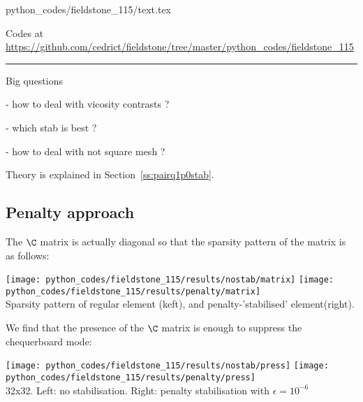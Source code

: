 \begin{flushright} {\tiny {\color{gray} python\_codes/fieldstone\_115/text.tex}} \end{flushright}

%

\begin{center}
Codes at \url{https://github.com/cedrict/fieldstone/tree/master/python_codes/fieldstone_115}
\end{center}

\par\noindent\rule{\textwidth}{0.4pt}



Big questions

- how to deal with vicosity contrasts ? 

- which stab is best ? 

- how to deal with not square mesh ?


Theory is explained in Section~\ref{ss:pairq1p0stab}.


\subsection*{Penalty approach}

The $\C$ matrix is actually diagonal so that the sparsity pattern of the matrix is as follows:
\begin{center}
\texttt{[image: python\_codes/fieldstone\_115/results/nostab/matrix]}
\texttt{[image: python\_codes/fieldstone\_115/results/penalty/matrix]}\\
{\captionfont Sparsity pattern of regular element (keft), and penalty-'stabilised' element(right).}
\end{center}

We find that the presence of the $\C$ matrix is enough to suppress the chequerboard mode:
\begin{center}
\texttt{[image: python\_codes/fieldstone\_115/results/nostab/press]}
\texttt{[image: python\_codes/fieldstone\_115/results/penalty/press]}\\
{\captionfont 32x32. Left: no stabilisation. Right: penalty stabilisation with $\epsilon=10^{-6}$}
\end{center}

